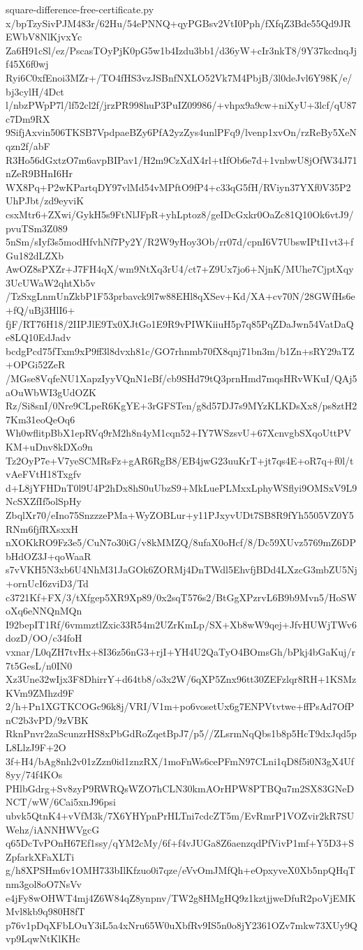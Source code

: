 \documentclass[11pt]{article}
\theoremstyle{definition}
\theoremstyle{remark}
\begin{document}
\begin{filecontents*}[overwrite]{square-difference-free-certificate.py}
x/bpTzySivPJM483r/62Hu/54ePNNQ+qyPGBsv2VtI0Pph/fXfqZ3Bde55Qd9JREWbV8NlKjvxYc
Za6H91cSl/ez/PscasTOyPjK0pG5w1b4Izdu3bb1/d36yW+cIr3nkT8/9Y37kcdnqJjf45X6f0wj
Ryi6C0xfEnoi3MZr+/TO4fHS3vzJSBnfNXLO52Vk7M4PbjB/3l0deJvl6Y98K/e/bj3cylH/4Dct
l/nbzPWpP7l/lf52cl2f/jrzPR998huP3PuIZ09986/+vhpx9a9cw+niXyU+3lcf/qU87c7Dm9RX
9SifjAxvin506TKSB7VpdpaeBZy6PfA2yzZys4unlPFq9/lvenp1xvOn/rzReBy5XeNqzn2f/abF
R3Ho56dGxtzO7m6avpBIPav1/H2m9CzXdX4rl+tIfOb6e7d+1vnbwU8jOfW34J71nZeR9BHnI6Hr
WX8Pq+P2wKPartqDY97vlMd54vMPftO9fP4+c33qG5fH/RViyn37YXf0V35P2UhPJbt/zd9eyviK
csxMtr6+ZXwi/GykH5s9FtNlJFpR+yhLptoz8/geIDcGxkr0OaZc81Q10Ok6vtJ9/pvuTSm3Z089
5nSm/sIyf3s5modHfvhNf7Py2Y/R2W9yHoy3Ob/rr07d/cpnI6V7UbswIPtI1vt3+fGu182dLZXb
AwOZ8sPXZr+J7FH4qX/wm9NtXq3rU4/ct7+Z9Ux7jo6+NjnK/MUhe7CjptXqy3UcUWaW2qhtXb5v
/TzSxgLnmUnZkbP1F53prbavck9l7w88EHl8qXSev+Kd/XA+cv70N/28GWfHs6e+fQ/uBj3HlI6+
fjF/RT76H18/2IIPJlE9Tx0XJtGo1E9R9vPIWKiiuH5p7q85PqZDaJwn54VatDaQe8LQ10EdJadv
bcdgPcd75fTxm9xP9ff3l8dvxh81c/GO7rhnmb70fX8qnj71bn3m/b1Zn+sRY29aTZ+OPGi52ZeR
/MGse8VqfeNU1XapzIyyVQnN1eBf/cb9SHd79tQ3prnHmd7mqsHRvWKuI/QAj5aOuWbWI3gUdOZK
Rz/Si8snI/0Nre9CLpeR6KgYE+3rGFSTen/g8d57DJ7s9MYzKLKDsXx8/ps8ztH27Km31eoQeOq6
Wh0wflitpBbX1epRVq9rM2h8n4yM1cqn52+IY7WSzsvU+67XcnvgbSXqoUttPVKM+uDnv8kDXo9n
Tz2OyP7e+V7yeSCMRsFz+gAR6RgB8/EB4jwG23uuKrT+jt7qs4E+oR7q+f0l/tvAeFVtH18Txgfv
d+L8jYFHDnT0l9U4P2hDx8hS0uUbzS9+MkLuePLMxxLphyWSflyi9OMSxV9L9NcSXZfIf5olSpHy
ZbqlXr70/eIno75SnzzzePMa+WyZOBLur+y11PJxyvUDt7SB8R9fYh5505VZ0Y5RNm6fjfRXsxxH
nXOKkRO9Fz3e5/CuN7o30iG/v8kMMZQ/8ufaX0oHcf/8/Dc59XUvz5769mZ6DPbHdOZ3J+qoWaaR
s7vVKH5N3xb6U4NhM31JaGOk6ZORMj4DnTWdl5EhvfjBDd4LXzcG3mbZU5Nj+ornUcI6zviD3/Td
c3721Kf+FX/3/tXfgep5XR9Xp89/0x2sqT576s2/BtGgXPzrvL6B9b9Mvn5/HoSWoXq6eNNQnMQn
I92bepIT1Rf/6vmmztlZxic33R54m2UZrKmLp/SX+Xb8wW9qej+JfvHUWjTWv6dozD/OO/c34foH
vxnar/L0qZH7tvHx+8I36z56nG3+rjI+YH4U2QaTyO4BOmsGh/bPkj4bGaKuj/r7t5GesL/n0IN0
Xz3Une32wIjx3F8DhirrY+d64tb8/o3x2W/6qXP5Znx96tt30ZEFzlqr8RH+1KSMzKVm9ZMhzd9F
2/h+Pn1XGTKCOGc96k8j/VRI/V1m+po6vosetUx6g7ENPVtvtwe+ffPsAd7OfPnC2b3vPD/9zVBK
RknPnvr2zaScunzrHS8xPbGdRoZqetBpJ7/p5//ZLsrmNqQbs1b8p5HcT9dxJqd5pL8LlzJ9F+2O
3f+H4/bAg8nh2v01zZzn0id1znzRX/1moFnWs6cePFmN97CLni1qD8f5i0N3gX4Uf8yy/74f4KOs
PHlbGdrg+Sv8zyP9RWRQsWZO7hCLN30kmAOrHPW8PTBQu7m2SX83GNeDNCT/wW/6Cai5xnJ96psi
ubvk5QtnK4+vVfM3k/7X6YHYpnPrHLTni7cdcZT5m/EvRmrP1VOZvir2kR7SUWehz/iANNHWVgcG
q65DcTvPOnH67Ef1ssy/qYM2cMy/6f+f4vJUGa8Z6aenzqdPfVivP1mf+Y5D3+SZpfarkXFaXLTi
g/h8XPSHm6v1OMH733bIlKfzuo0i7qze/eVvOmJMfQh+eOpxyveX0Xb5npQHqTnm3gol8oO7NsVv
e4jFy8wOHWT4mj4Z6W84qZ8ynpnv/TW2g8HMgHQ9z1kztjjweDfuR2poVjEMKMvl8kb9q980H8fT
p76v1pDqXFbLOuY3iL5a4xNru65W0uXbfRv9IS5n0o8jY2361OZv7mkw73XUy9Qvp9LqwNtKlKHc

\end{filecontents*}
\end{document}
